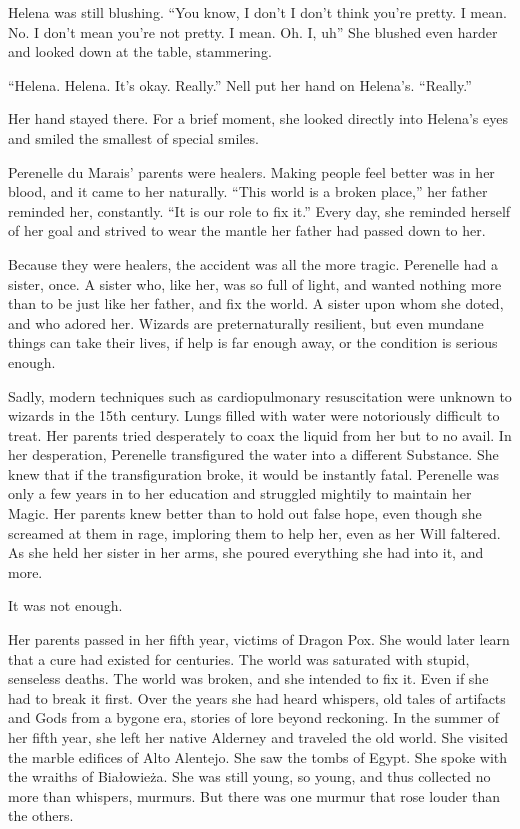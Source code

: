 Helena was still blushing. “You know, I don’t{\el} I don’t think you’re pretty. I mean. No. I don’t mean you’re not pretty. I mean. Oh. I, uh{\el}” She blushed even harder and looked down at the table, stammering.

“Helena. Helena. It’s okay. Really.” Nell put her hand on Helena’s. “Really.”

Her hand stayed there. For a brief moment, she looked directly into Helena’s eyes and smiled the smallest of special smiles.

Perenelle du Marais’ parents were healers. Making people feel better was in her blood, and it came to her naturally. “This world is a broken place,” her father reminded her, constantly. “It is our role to fix it.” Every day, she reminded herself of her goal and strived to wear the mantle her father had passed down to her.

Because they were healers, the accident was all the more tragic. Perenelle had a sister, once. A sister who, like her, was so full of light, and wanted nothing more than to be just like her father, and fix the world. A sister upon whom she doted, and who adored her. Wizards are preternaturally resilient, but even mundane things can take their lives, if help is far enough away, or the condition is serious enough.

Sadly, modern techniques such as cardiopulmonary resuscitation were unknown to wizards in the 15th century. Lungs filled with water were notoriously difficult to treat. Her parents tried desperately to coax the liquid from her but to no avail. In her desperation, Perenelle transfigured the water into a different Substance. She knew that if the transfiguration broke, it would be instantly fatal. Perenelle was only a few years in to her education and struggled mightily to maintain her Magic. Her parents knew better than to hold out false hope, even though she screamed at them in rage, imploring them to help her, even as her Will faltered. As she held her sister in her arms, she poured everything she had into it, and more.

It was not enough.

Her parents passed in her fifth year, victims of Dragon Pox. She would later learn that a cure had existed for centuries. The world was saturated with stupid, senseless deaths. The world was broken, and she intended to fix it. Even if she had to break it first. Over the years she had heard whispers, old tales of artifacts and Gods from a bygone era, stories of lore beyond reckoning. In the summer of her fifth year, she left her native Alderney and traveled the old world. She visited the marble edifices of Alto Alentejo. She saw the tombs of Egypt. She spoke with the wraiths of Białowieża. She was still young, so young, and thus collected no more than whispers, murmurs. But there was one murmur that rose louder than the others.

